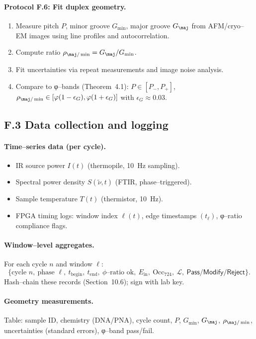 \documentclass[11pt]{article}
\begin{document}
\paragraph{Protocol F.6: Fit duplex geometry.}
\begin{enumerate}
\item Measure pitch $P$, minor groove $G_{\min}$, major groove $G_{\maj}$ from AFM/cryo–EM images using line profiles and autocorrelation.
\item Compute ratio $\rho_{\maj/\min}=G_{\maj}/G_{\min}$.
\item Fit uncertainties via repeat measurements and image noise analysis.
\item Compare to φ–bands (Theorem~4.1): $P\in[P_-,P_+]$, $\rho_{\maj/\min}\in[\varphi(1-\epsilon_G),\varphi(1+\epsilon_G)]$ with $\epsilon_G\approx 0.03$.
\end{enumerate}

\subsection*{F.3 Data collection and logging}

\paragraph{Time–series data (per cycle).}
\begin{itemize}
\item IR source power $I(t)$ (thermopile, 10~Hz sampling).
\item Spectral power density $S(\tilde\nu,t)$ (FTIR, phase–triggered).
\item Sample temperature $T(t)$ (thermistor, 10~Hz).
\item FPGA timing logs: window index $\ell(t)$, edge timestamps $(t_\ell)$, φ–ratio compliance flags.
\end{itemize}

\paragraph{Window–level aggregates.}
For each cycle $n$ and window $\ell$:
\[
\big\{\text{cycle }n,\ \text{phase }\ell,\ t_{\mathrm{begin}},\ t_{\mathrm{end}},\ \phi\text{–ratio ok},\ E_{\mathrm{in}},\ \mathrm{Occ}_{724},\ \mathcal{L},\ \textsf{Pass/Modify/Reject}\big\}.
\]
Hash–chain these records (Section~10.6); sign with lab key.

\paragraph{Geometry measurements.}
Table: sample ID, chemistry (DNA/PNA), cycle count, $P$, $G_{\min}$, $G_{\maj}$, $\rho_{\maj/\min}$, uncertainties (standard errors), φ–band pass/fail.
\end{document}
